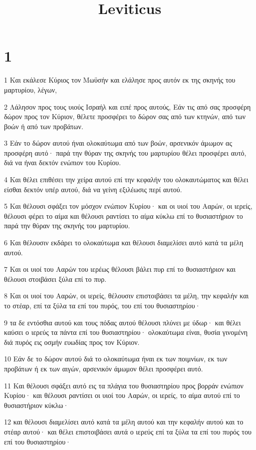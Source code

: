

\title{Leviticus}


\chapter{1}

\par 1 Και εκάλεσε Κύριος τον Μωϋσήν και ελάλησε προς αυτόν εκ της σκηνής του μαρτυρίου, λέγων,
\par 2 Λάλησον προς τους υιούς Ισραήλ και ειπέ προς αυτούς, Εάν τις από σας προσφέρη δώρον προς τον Κύριον, θέλετε προσφέρει το δώρον σας από των κτηνών, από των βοών ή από των προβάτων.
\par 3 Εάν το δώρον αυτού ήναι ολοκαύτωμα από των βοών, αρσενικόν άμωμον ας προσφέρη αυτό· παρά την θύραν της σκηνής του μαρτυρίου θέλει προσφέρει αυτό, διά να ήναι δεκτόν ενώπιον του Κυρίου.
\par 4 Και θέλει επιθέσει την χείρα αυτού επί την κεφαλήν του ολοκαυτώματος και θέλει είσθαι δεκτόν υπέρ αυτού, διά να γείνη εξιλέωσις περί αυτού.
\par 5 Και θέλουσι σφάξει τον μόσχον ενώπιον Κυρίου· και οι υιοί του Ααρών, οι ιερείς, θέλουσι φέρει το αίμα και θέλουσι ραντίσει το αίμα κύκλω επί το θυσιαστήριον το παρά την θύραν της σκηνής του μαρτυρίου.
\par 6 Και θέλουσιν εκδάρει το ολοκαύτωμα και θέλουσι διαμελίσει αυτό κατά τα μέλη αυτού.
\par 7 Και οι υιοί του Ααρών του ιερέως θέλουσι βάλει πυρ επί το θυσιαστήριον και θέλουσι στοιβάσει ξύλα επί το πυρ.
\par 8 Και οι υιοί του Ααρών, οι ιερείς, θέλουσιν επιστοιβάσει τα μέλη, την κεφαλήν και το στέαρ, επί τα ξύλα τα επί του πυρός, του επί του θυσιαστηρίου·
\par 9 τα δε εντόσθια αυτού και τους πόδας αυτού θέλουσι πλύνει με ύδωρ· και θέλει καύσει ο ιερεύς τα πάντα επί του θυσιαστηρίου· ολοκαύτωμα είναι, θυσία γινομένη διά πυρός εις οσμήν ευωδίας προς τον Κύριον.
\par 10 Εάν δε το δώρον αυτού διά το ολοκαύτωμα ήναι εκ των ποιμνίων, εκ των προβάτων ή εκ των αιγών, αρσενικόν άμωμον θέλει προσφέρει αυτό.
\par 11 Και θέλουσι σφάξει αυτό εις τα πλάγια του θυσιαστηρίου προς βορράν ενώπιον Κυρίου· και θέλουσι ραντίσει οι υιοί του Ααρών, οι ιερείς, το αίμα αυτού επί το θυσιαστήριον κύκλω·
\par 12 και θέλουσι διαμελίσει αυτό κατά τα μέλη αυτού και την κεφαλήν αυτού και το στέαρ αυτού· και θέλει επιστοιβάσει αυτά ο ιερεύς επί τα ξύλα τα επί του πυρός του επί του θυσιαστηρίου·
